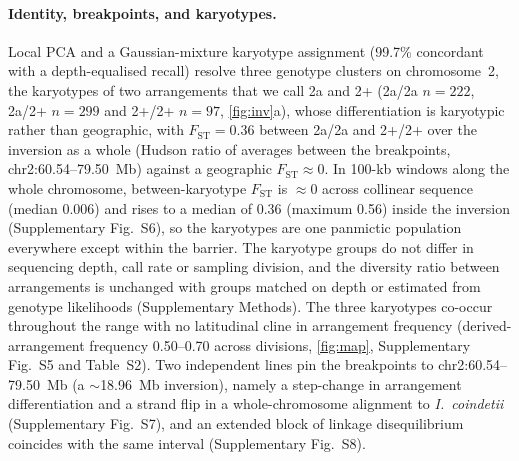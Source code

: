 \documentclass[11pt]{article}
\newcommand{\coin}{\textit{I.\ coindetii}}
\newcommand{\Fst}{F_\mathrm{ST}}
\begin{document}
\paragraph{Identity, breakpoints, and karyotypes.}
Local PCA \citep{li2019lostruct} and a Gaussian-mixture karyotype assignment
(99.7\% concordant with a depth-equalised recall) resolve three genotype clusters on chromosome~2, the karyotypes of two arrangements that we call 2a and 2+ (2a/2a $n=222$, 2a/2+ $n=299$ and 2+/2+ $n=97$, \cref{fig:inv}a), whose differentiation is karyotypic
rather than geographic, with $\Fst=0.36$ between 2a/2a and 2+/2+ over the inversion as a whole (Hudson ratio of averages between the breakpoints, chr2:60.54--79.50~Mb)
against a geographic $\Fst\approx0$. In 100-kb windows along the whole chromosome, between-karyotype $\Fst$ is
$\approx0$ across collinear sequence (median 0.006) and rises to a median of 0.36 (maximum 0.56) inside the inversion
(Supplementary Fig.~S6), so the karyotypes are one panmictic population everywhere except within the barrier. The karyotype groups do not differ in sequencing depth, call rate or sampling division, and the diversity ratio between arrangements is unchanged with groups matched on depth or estimated from genotype likelihoods (Supplementary Methods). The three karyotypes co-occur throughout the range with no
latitudinal cline in arrangement frequency (derived-arrangement frequency 0.50--0.70 across divisions, \cref{fig:map}, Supplementary Fig.~S5 and Table~S2). Two independent lines pin
the breakpoints to chr2:60.54--79.50~Mb (a $\sim$18.96~Mb inversion),
namely a step-change in arrangement differentiation and a strand flip in a
whole-chromosome alignment to \coin{} (Supplementary Fig.~S7), and an extended block of linkage disequilibrium coincides with the same interval (Supplementary
Fig.~S8).
\end{document}
